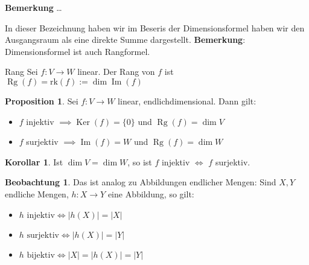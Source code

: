 \documentclass[oneside,fontsize=11pt,paper=a4,BCOR=0mm,DIV=12,automark,headsepline]{scrbook}
\DeclareMathOperator{\mdim}{dim}
\DeclareMathOperator{\mKer}{Ker}
\DeclareMathOperator{\mIm}{Im}
\DeclareMathOperator{\mRg}{Rg}
\theoremstyle{remark}
\theoremstyle{definition}
\newtheorem{beobachtung}{Beobachtung}
\newtheorem*{proposition}{Proposition}
\newtheorem*{korollar}{Korollar}
\theoremstyle{definition}
\theoremstyle{remark}
\begin{document}
\textbf{Bemerkung} \ldots{}

In dieser Bezeichnung haben wir im Beseris der Dimensionsformel haben wir den
Ausgangsraum als eine direkte Summe dargestellt. 
\textbf{Bemerkung}: Dimensionsformel ist auch Rangformel.

\begin{definition}{Rang}{}
  Sei $f:V\to W$ linear. Der Rang von \(f\) ist $\mRg(f) = \text{rk}(f) := \dim\mIm(f)$
\end{definition}

\begin{proposition} Sei \(f:V\to W\) linear, endlichdimensional.
  Dann gilt:
  \begin{itemize}
  \item $f$ injektiv $\implies \mKer(f) = \{0\}$ und $ \mRg(f) = \dim V$
  \item $f$ surjektiv $\implies \mIm(f) = W$ und $\mRg(f) = \dim W$
  \end{itemize}
\end{proposition}


\begin{korollar} Ist \(\mdim V = \mdim W \), so ist \(f\) injektiv $\iff $ \(f\) surjektiv.\end{korollar}
\begin{beobachtung}
  Das ist analog zu Abbildungen endlicher Mengen: Sind \(X,Y\) endliche Mengen, \(h: X\to Y\) eine Abbildung, so gilt:
  \begin{itemize}
  \item \(h\text{ injektiv} \iff |h(X)| = |X| \)
  \item \(h\text{ surjektiv} \iff |h(X)| = |Y| \)
  \item \(h\text{ bijektiv} \iff |X|=|h(X)|=|Y| \)
  \end{itemize}
\end{beobachtung}
\end{document}
